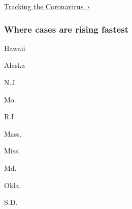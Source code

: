 \href{https://www.nytimes3xbfgragh.onion/interactive/2020/us/coronavirus-us-cases.html}{Tracking
the Coronavirus~›}

\href{https://www.nytimes3xbfgragh.onion/interactive/2020/us/coronavirus-us-cases.html}{}

\hypertarget{where-cases-are-rising-fastest}{%
\subsubsection{\texorpdfstring{Where cases are \textbf{rising}
fastest}{Where cases are rising fastest}}\label{where-cases-are-rising-fastest}}

\href{https://www.nytimes3xbfgragh.onion/interactive/2020/us/hawaii-coronavirus-cases.html}{}

Hawaii

\href{https://www.nytimes3xbfgragh.onion/interactive/2020/us/alaska-coronavirus-cases.html}{}

Alaska

\href{https://www.nytimes3xbfgragh.onion/interactive/2020/us/new-jersey-coronavirus-cases.html}{}

N.J.

\href{https://www.nytimes3xbfgragh.onion/interactive/2020/us/missouri-coronavirus-cases.html}{}

Mo.

\href{https://www.nytimes3xbfgragh.onion/interactive/2020/us/rhode-island-coronavirus-cases.html}{}

R.I.

\href{https://www.nytimes3xbfgragh.onion/interactive/2020/us/massachusetts-coronavirus-cases.html}{}

Mass.

\href{https://www.nytimes3xbfgragh.onion/interactive/2020/us/mississippi-coronavirus-cases.html}{}

Miss.

\href{https://www.nytimes3xbfgragh.onion/interactive/2020/us/maryland-coronavirus-cases.html}{}

Md.

\href{https://www.nytimes3xbfgragh.onion/interactive/2020/us/oklahoma-coronavirus-cases.html}{}

Okla.

\href{https://www.nytimes3xbfgragh.onion/interactive/2020/us/south-dakota-coronavirus-cases.html}{}

S.D.

\href{https://www.nytimes3xbfgragh.onion/interactive/2020/us/kentucky-coronavirus-cases.html}{}

